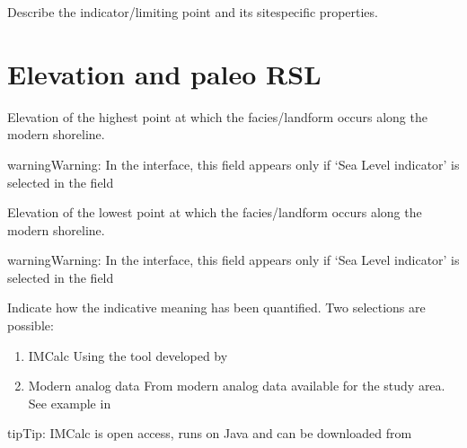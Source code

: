\documentclass[letterpaper,10pt,english]{sphinxmanual}
\begin{document}
 \sphinxhyphen{} Describe the indicator/limiting point and its site\sphinxhyphen{}specific properties.


\section{Elevation and paleo RSL}
\label{\detokenize{RSL_data:elevation-and-paleo-rsl}}
 \sphinxhyphen{} Elevation of the highest point at which the facies/landform occurs along the modern shoreline.

\begin{sphinxadmonition}{warning}{Warning:}
In the interface, this field appears only if ‘Sea Level indicator’ is selected in the field 
\end{sphinxadmonition}

 \sphinxhyphen{} Elevation of the lowest point at which the facies/landform occurs along the modern shoreline.

\begin{sphinxadmonition}{warning}{Warning:}
In the interface, this field appears only if ‘Sea Level indicator’ is selected in the field 
\end{sphinxadmonition}

 \sphinxhyphen{} Indicate how the indicative meaning has been quantified. Two selections are possible:
\begin{enumerate}
%
\item {} 
IMCalc \sphinxhyphen{} Using the tool developed by 

\item {} 
Modern analog data \sphinxhyphen{} From modern analog data available for the study area. See example in 

\end{enumerate}

\begin{sphinxadmonition}{tip}{Tip:}
IMCalc is open access, runs on Java and can be downloaded from 
\end{sphinxadmonition}
\end{document}
